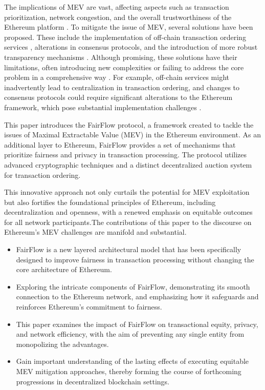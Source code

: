 \documentclass{article}
\begin{document}
The implications of MEV are vast, affecting aspects such as transaction prioritization, network congestion, and the overall trustworthiness of the Ethereum platform \citep{daian2019flash} \citep{qin2020quantifying}. To mitigate the issue of MEV, several solutions have been proposed. These include the implementation of off-chain transaction ordering services \citep{buterin2021rollup}, alterations in consensus protocols, and the introduction of more robust transparency mechanisms \citep{eipgithub}. Although promising, these solutions have their limitations, often introducing new complexities or failing to address the core problem in a comprehensive way \citep{gudgeon2020sok}. For example, off-chain services might inadvertently lead to centralization in transaction ordering, and changes to consensus protocols could require significant alterations to the Ethereum framework, which pose substantial implementation challenges \citep{ethereumfoundation2020}.

This paper introduces the FairFlow protocol, a framework created to tackle the issues of Maximal Extractable Value (MEV) in the Ethereum environment. As an additional layer to Ethereum, FairFlow provides a set of mechanisms that prioritize fairness and privacy in transaction processing. The protocol utilizes advanced cryptographic techniques and a distinct decentralized auction system for transaction ordering.

This innovative approach not only curtails the potential for MEV exploitation but also fortifies the foundational principles of Ethereum, including decentralization and openness, with a renewed emphasis on equitable outcomes for all network participants.The contributions of this paper to the discourse on Ethereum's MEV challenges are manifold and substantial.

\begin{itemize}
    \item FairFlow is a new layered architectural model that has been specifically designed to improve fairness in transaction processing without changing the core architecture of Ethereum.
    \item Exploring the intricate components of FairFlow, demonstrating its smooth connection to the Ethereum network, and emphasizing how it safeguards and reinforces Ethereum's commitment to fairness.
    \item This paper examines the impact of FairFlow on transactional equity, privacy, and network efficiency, with the aim of preventing any single entity from monopolizing the advantages.
    \item Gain important understanding of the lasting effects of executing equitable MEV mitigation approaches, thereby forming the course of forthcoming progressions in decentralized blockchain settings.
\end{itemize}
\end{document}
